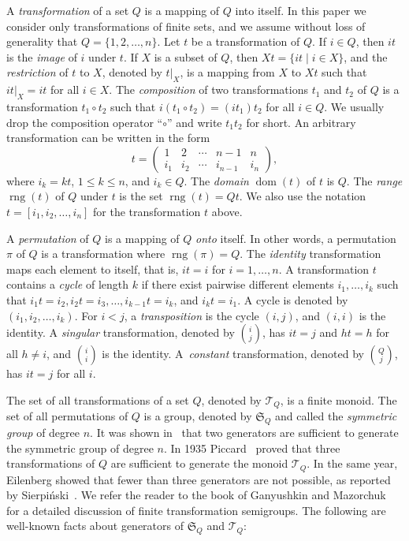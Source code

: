 \documentclass{llncs}
\renewcommand{\le}{\leqslant}
\newcommand{\timg}{\mathop{\mbox{rng}}}
\newcommand{\tdom}{\mathop{\mbox{dom}}}
\newcommand{\cT}{{\mathcal T}}
\begin{document}
A {\em transformation} of a set $Q$ is a mapping of $Q$ into itself. In this paper we consider only transformations of finite sets, and we assume without loss of generality  that $Q = \{1,2,\ldots, n\}$. Let $t$ be a transformation of $Q$. If  $i \in Q$, then $it$ is the {\it image} of $i$ under $t$.  If $X$ is a subset of $Q$, then $Xt = \{it \mid i \in X\}$, and the {\em restriction} of $t$ to $X$, denoted by $t|_X$, is a mapping from $X$ to $Xt$ such that $it|_X = it$ for all $i \in X$. The {\em composition} of two transformations $t_1$ and $t_2$ of $Q$ is a transformation $t_1 \circ t_2$ such that $i (t_1 \circ t_2) = (i t_1) t_2$ for all $i \in Q$. We usually drop the composition operator ``$\circ$'' and write $t_1t_2$ for short. 
An arbitrary transformation can be written in the form
\begin{equation*}\label{eq:transmatrix}
t=\left( \begin{array}{ccccc}
1 & 2 &   \cdots &  n-1 & n \\
i_1 & i_2 &   \cdots &  i_{n-1} & i_n
\end{array} \right ),
\end{equation*}
where $i_k = kt$,  $1\le k\le n$, and $i_k\in Q$. The {\em domain} $\tdom(t)$ of $t$ is $Q.$
The {\em range} $\timg(t)$ of $Q$ under $t$ is the set
$\timg(t) = Q t.$ We also use the notation $t = [i_1,i_2,\ldots,i_n]$ for the transformation $t$ above. 

A \emph{permutation} of $Q$ is a mapping of $Q$ \emph{onto} itself. In other words,  a permutation $\pi$ of $Q$ is a transformation where $\timg(\pi) = Q$. 
The \emph{identity} transformation maps each element to itself, that is, $it=i$ for $i=1,\ldots,n$.
A transformation $t$ contains a \emph{cycle} of length $k$ if there exist pairwise different elements $i_1,\ldots,i_k$ such that
$i_1t=i_2, i_2t=i_3,\ldots, i_{k-1}t=i_k$, and $i_kt=i_1$.
A cycle is denoted by $(i_1,i_2,\ldots,i_k)$.
For $i<j$, a \emph{transposition} is the cycle $(i,j)$, and $(i,i)$ is the identity.
A \emph{singular} transformation, denoted by $i\choose j$, has $it=j$ and $ht=h$ for all $h\neq i$, and $i \choose i$ is the identity.
A~\emph{constant} transformation,  denoted by $Q \choose j$, has $it=j$ for all $i$.

The set of all transformations of a set $Q$, denoted by $\cT_Q$, is a finite monoid. The set of all permutations of $Q$ is a group, denoted by $\mathfrak{S}_Q$ and called the \emph{symmetric group} of degree $n$. 
It was shown in~\cite{Hoy1895,Pic38} that two generators are sufficient to generate the symmetric group of degree $n$. 
In 1935 Piccard~\cite{Pic35} proved that three transformations of $Q$ are sufficient to generate the monoid $\cT_Q$. In the same year, Eilenberg showed that fewer than three generators are not possible, as reported by Sierpi\'nski~\cite{Sie35}. We refer the reader to the book of Ganyushkin and Mazorchuk~\cite{GaMa09} for a detailed discussion of finite transformation semigroups. The following are well-known facts about generators of $\mathfrak{S}_Q$ and $\cT_Q$: 
\end{document}
